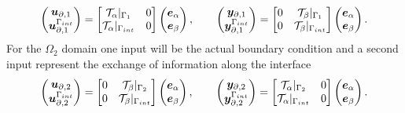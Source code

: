 \documentclass[11pt,a4paper]{article}
\begin{document}
\begin{equation}\label{eq:input_ouput_1}
    \begin{pmatrix}
        \bm{u}_{\partial, 1} \\
        \bm{u}_{\partial, 1}^{\Gamma_{\rm int}}
    \end{pmatrix} = 
    \begin{bmatrix}
        \mathcal{T}_{\alpha}\vert_{\Gamma_1} & 0 \\
        \mathcal{T}_{\alpha}\vert_{\Gamma_{\rm int}} & 0
    \end{bmatrix}
    \begin{pmatrix}
        \bm{e}_\alpha \\
        \bm{e}_\beta
    \end{pmatrix}, \qquad
    \begin{pmatrix}
        \bm{y}_{\partial,1} \\
        \bm{y}_{\partial,1}^{\Gamma_{\rm int}}
    \end{pmatrix} = 
    \begin{bmatrix}
        0 & \mathcal{T}_{\beta}\vert_{\Gamma_1} \\
        0 & \mathcal{T}_{\beta}\vert_{\Gamma_{\rm int}}
    \end{bmatrix}
    \begin{pmatrix}
        \bm{e}_\alpha \\
        \bm{e}_\beta
    \end{pmatrix}.
\end{equation}
For the $\Omega_2$ domain one input will be the actual boundary condition and a second input represent the exchange of information along the interface
\begin{equation}\label{eq:input_ouput_2}
    \begin{pmatrix}
        \bm{u}_{\partial,2} \\
        \bm{u}_{\partial,2}^{\Gamma_{\rm int}}
    \end{pmatrix} = 
    \begin{bmatrix}
        0 & \mathcal{T}_{\beta}\vert_{\Gamma_2} \\
        0 & \mathcal{T}_{\beta}\vert_{\Gamma_{\rm int}}
    \end{bmatrix}
    \begin{pmatrix}
        \bm{e}_\alpha \\
        \bm{e}_\beta
    \end{pmatrix}, \qquad
    \begin{pmatrix}
        \bm{y}_{\partial,2} \\
        \bm{y}_{\partial,2}^{\Gamma_{\rm int}}
    \end{pmatrix} = 
    \begin{bmatrix}
        \mathcal{T}_{\alpha}\vert_{\Gamma_2} & 0\\
        \mathcal{T}_{\alpha}\vert_{\Gamma_{\rm int}} & 0
    \end{bmatrix}
    \begin{pmatrix}
        \bm{e}_\alpha \\
        \bm{e}_\beta
    \end{pmatrix}.
\end{equation}
\end{document}
